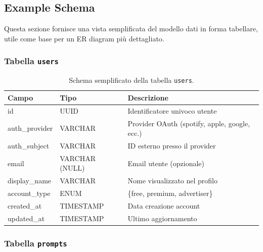 \documentclass[11pt,a4paper]{article}
\begin{document}

\subsection{Example Schema}

Questa sezione fornisce una vista semplificata del modello dati in forma tabellare, utile come base per un ER diagram più dettagliato.

\subsubsection*{Tabella \texttt{users}}

\begin{table}[H]
    \centering
    \begin{tabular}{llp{7cm}}
        \toprule
        \textbf{Campo} & \textbf{Tipo} & \textbf{Descrizione} \\
        \midrule
        id & UUID & Identificatore univoco utente \\
        auth\_provider & VARCHAR & Provider OAuth (spotify, apple, google, ecc.) \\
        auth\_subject & VARCHAR & ID esterno presso il provider \\
        email & VARCHAR (NULL) & Email utente (opzionale) \\
        display\_name & VARCHAR & Nome visualizzato nel profilo \\
        account\_type & ENUM & \{free, premium, advertiser\} \\
        created\_at & TIMESTAMP & Data creazione account \\
        updated\_at & TIMESTAMP & Ultimo aggiornamento \\
        \bottomrule
    \end{tabular}
    \caption{Schema semplificato della tabella \texttt{users}.}
\end{table}

\subsubsection*{Tabella \texttt{prompts}}
\end{document}
